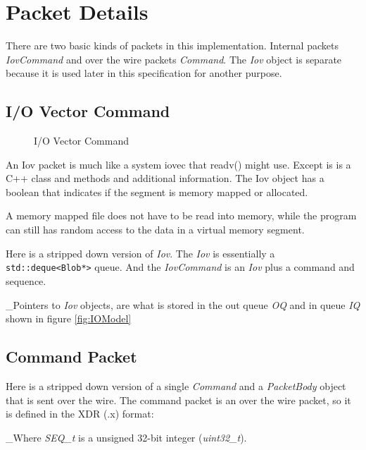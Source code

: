 \section{Packet Details}
There are two basic kinds of packets in this implementation.
Internal packets \textit{IovCommand} and over the wire
packets \textit{Command}.
The \textit{Iov} object is separate because it is used
later in this specification for another purpose.

\subsection{I/O Vector Command}
\begin{figure}
  \centering
  
  \caption{I/O Vector Command}
  \label{fig:IovPacket}
\end{figure}

An Iov packet is much like a system iovec that readv() might use.
Except is is a C++ class and methods and additional information.
The Iov object has a boolean that indicates if the segment
is memory mapped or allocated.

A memory mapped file does not have to be read into memory, while
the program can still has random access to the data in a virtual
memory segment.

Here is a stripped down version of \textit{Iov}.
The \textit{Iov} is essentially a \verb|std::deque<Blob*>| queue.
And the \textit{IovCommand} is an \textit{Iov} plus a command
and sequence.


_Pointers to \textit{Iov} objects, are what is stored in the
out queue \textit{OQ}
and in queue \textit{IQ} shown in figure \ref{fig:IOModel}

\subsection{Command Packet}
Here is a stripped down version of a single \textit{Command} and
a \textit{PacketBody} object that is sent over the wire.
The command packet is an over the wire packet, so it is defined in
the XDR (.x) format:


_Where \textit{SEQ\_t} is a unsigned 32-bit integer (\textit{uint32\_t}).


